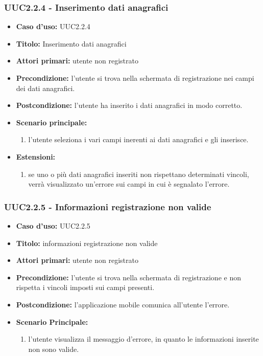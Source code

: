 \documentclass[casi-duso]{subfiles}
\begin{document}
\subsubsection{UUC2.2.4 - Inserimento dati anagrafici}
\label{subsub:UUC2.2.4utente}
\begin{itemize}
  \item \textbf{Caso d’uso:} UUC2.2.4 
  \item \textbf{Titolo:} Inserimento dati anagrafici
  \item \textbf{Attori primari:} utente non registrato
  \item \textbf{Precondizione:} l'utente si trova nella schermata di registrazione nei campi dei dati anagrafici.
  \item \textbf{Postcondizione:} l'utente ha inserito i dati anagrafici in modo corretto. 
  \item \textbf{Scenario principale:} 
  \begin{enumerate}
    \item l'utente seleziona i vari campi inerenti ai dati anagrafici e gli inserisce.
  \end{enumerate}
  \item \textbf{Estensioni:} 
  \begin{enumerate}
    \item se uno o più dati anagrafici inseriti non rispettano determinati vincoli, verrà visualizzato un'errore sui campi in cui è segnalato l'errore.
  \end{enumerate}     
\end{itemize}

\subsubsection{UUC2.2.5 - Informazioni registrazione non valide}
\label{subsub:UUC2.2.5utente}
\begin{itemize}
  \item \textbf{Caso d’uso:} UUC2.2.5 
  \item \textbf{Titolo:} informazioni registrazione non valide
  \item \textbf{Attori primari:} utente non registrato
  \item \textbf{Precondizione:} l'utente si trova nella schermata di registrazione e non rispetta i vincoli imposti sui campi presenti.
  \item \textbf{Postcondizione:} l'applicazione mobile comunica all'utente l'errore.
  \item \textbf{Scenario Principale:} 
  \begin{enumerate}
    \item l'utente visualizza il messaggio d'errore, in quanto le informazioni inserite non sono valide.
  \end{enumerate}   
\end{itemize}
\end{document}
